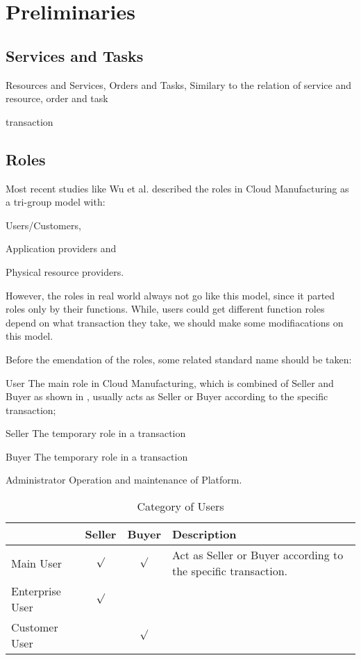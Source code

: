 \section{Preliminaries} %
\subsection{Services and Tasks}
Resources and Services, Orders and Tasks,
Similary to the relation of service and resource, order and task 

transaction

\subsection{Roles}
Most recent studies like Wu et al.\cite{Wu2013} described the roles in Cloud Manufacturing as a tri-group model with:\begin{inparaenum}[1)]
\item Users/Customers,
\item Application providers and
\item Physical resource providers.
\end{inparaenum}
However, the roles in real world always not go like this model, since it parted roles only by their functions. While, users could get different function roles depend on what transaction they take, we should make some modifiacations on this model.

Before the emendation of the roles, some related standard name should be taken:
\begin{asparadesc}
\item[User] The main role in Cloud Manufacturing, which is combined of Seller and Buyer as shown in , usually acts as Seller or Buyer according to the specific transaction;

\item[Seller] The temporary role in a transaction
\item[Buyer] The temporary role in a transaction
\item[Administrator] Operation and maintenance of Platform.
\end{asparadesc}

\begin{table}[htbp]
  \centering
  \caption{Category of Users}
    \begin{tabularx}{\textwidth}{lccX}
    \toprule
          & Seller & Buyer & Description \\
    \midrule
    Main User & $\surd$ & $\surd$ & Act as Seller or Buyer according to the specific transaction. \\
    Enterprise User & $\surd$ & &  \\
    Customer User& & $\surd$ &  \\
    \bottomrule
    \end{tabularx}%
  \label{tab:categoryuser}%
\end{table}%

